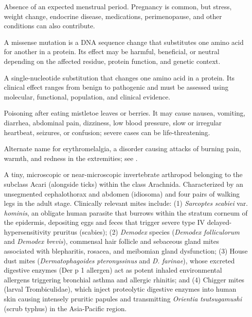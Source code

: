  Absence of an expected menstrual period. Pregnancy is common, but stress, weight change, endocrine disease, medications, perimenopause, and other conditions can also contribute.

 A missense mutation is a DNA sequence change that substitutes one amino acid for another in a protein. Its effect may be harmful, beneficial, or neutral depending on the affected residue, protein function, and genetic context.

 A single-nucleotide substitution that changes one amino acid in a protein. Its clinical
effect ranges from benign to pathogenic and must be assessed using molecular,
functional, population, and clinical evidence.

 Poisoning after eating mistletoe leaves or berries. It may cause nausea, vomiting, diarrhea, abdominal pain, dizziness, low blood pressure, slow or irregular heartbeat, seizures, or confusion; severe cases can be life-threatening.

 Alternate name for erythromelalgia, a disorder causing attacks of burning pain, warmth, and redness in the extremities; see .

 A tiny, microscopic or near-microscopic invertebrate arthropod belonging to the subclass Acari (alongside ticks) within the class Arachnida. Characterized by an unsegmented cephalothorax and abdomen (idiosoma) and four pairs of walking legs in the adult stage. Clinically relevant mites include: (1) \textit{Sarcoptes scabiei} var. \textit{hominis}, an obligate human parasite that burrows within the stratum corneum of the epidermis, depositing eggs and feces that trigger severe type IV delayed-hypersensitivity pruritus (scabies); (2) \textit{Demodex} species (\textit{Demodex folliculorum} and \textit{Demodex brevis}), commensal hair follicle and sebaceous gland mites associated with blepharitis, rosacea, and meibomian gland dysfunction; (3) House dust mites (\textit{Dermatophagoides pteronyssinus} and \textit{D. farinae}), whose excreted digestive enzymes (Der p 1 allergen) act as potent inhaled environmental allergens triggering bronchial asthma and allergic rhinitis; and (4) Chigger mites (larval Trombiculidae), which inject proteolytic digestive enzymes into human skin causing intensely pruritic papules and transmitting \textit{Orientia tsutsugamushi} (scrub typhus) in the Asia-Pacific region.

